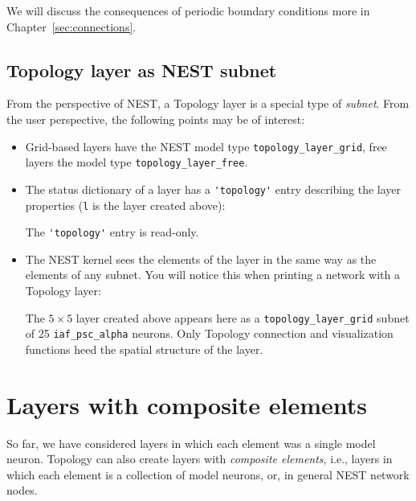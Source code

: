 \documentclass[a4paper,12pt]{report}
\begin{document}
We will discuss the consequences of periodic boundary conditions more
in Chapter~\ref{sec:connections}.

\subsection{Topology layer as NEST subnet}\label{sec:subnet}

From the perspective of NEST, a Topology layer is a special type of
\emph{subnet}. From the user perspective, the following
points may be of interest:
\begin{itemize}
\item Grid-based layers have the NEST model type
  \lstinline!topology_layer_grid!, free
  layers the model type
  \lstinline!topology_layer_free!.
\item The status dictionary of a layer has a \lstinline!'topology'!
  entry describing the layer properties (\lstinline!l! is the layer
  created above):
%


%
The \lstinline!'topology'! entry is read-only. 
\item The NEST kernel sees the elements of the layer in the same way
  as the elements of any subnet. You will notice this when printing a
  network with a Topology layer:
%


%
The $5\times 5$ layer created above appears here as a
\lstinline!topology_layer_grid! subnet of 25 \lstinline!iaf_psc_alpha!
neurons.
Only Topology connection and visualization functions heed the spatial
structure of the layer.
\end{itemize}

\section{Layers with composite elements}\label{sec:composite_layers}

So far, we have considered layers in which each element was a single
model neuron. Topology can also create layers with \emph{composite
  elements}, i.e., layers in which each
element is a collection of model neurons, or, in
general NEST network nodes.
\end{document}
